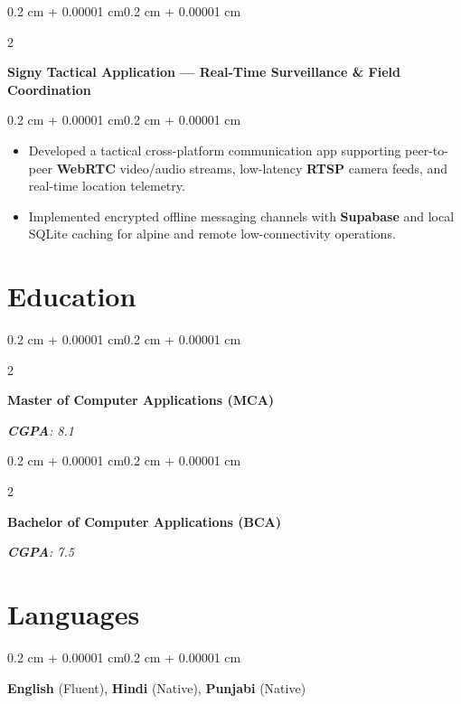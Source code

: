 \documentclass[10pt, a4paper]{article}
\newenvironment{highlights}{
    \begin{itemize}[
        topsep=0.06 cm,
        parsep=0.05 cm,
        partopsep=0pt,
        itemsep=0pt,
        leftmargin=0.4 cm + 10pt
    ]
}{
    \end{itemize}
}
\newenvironment{onecolentry}{
    \begin{adjustwidth}{0.2 cm + 0.00001 cm}{0.2 cm + 0.00001 cm}
}{
    \end{adjustwidth}
}
\newenvironment{twocolentry}[2][]{
    \onecolentry
    \def\secondColumn{#2}
    \setcolumnwidth{\fill, 4.5 cm}
    \begin{paracol}{2}
}{
    \switchcolumn \raggedleft \secondColumn
    \end{paracol}
    \endonecolentry
}
\let\hrefWithoutArrow\href
\renewcommand{\href}[2]{\hrefWithoutArrow{#1}{\ifthenelse{\equal{#2}{}}{ }{#2 }\raisebox{.15ex}{\footnotesize \faExternalLink*}}}
\begin{document}
\begin{twocolentry}{\textit{\href{https://github.com/I-am-Manu-Singh/Signy-App}{\underline{Repo}}}}
    \textbf{Signy Tactical Application — Real-Time Surveillance \& Field Coordination}
\end{twocolentry}
\vspace{0.06 cm}
\begin{onecolentry}
    \begin{highlights}
    \item Developed a tactical cross-platform communication app supporting peer-to-peer \textbf{WebRTC} video/audio streams, low-latency \textbf{RTSP} camera feeds, and real-time location telemetry.
    \item Implemented encrypted offline messaging channels with \textbf{Supabase} and local SQLite caching for alpine and remote low-connectivity operations.
    \end{highlights}
\end{onecolentry}

\section{Education}
\begin{twocolentry}{\textit{\textbf{CGPA}: 8.1}}
    \textbf{Master of Computer Applications (MCA)} 
\end{twocolentry}
\vspace{0.04 cm}
\begin{twocolentry}{\textit{\textbf{CGPA}: 7.5}}
    \textbf{Bachelor of Computer Applications (BCA)} 
\end{twocolentry}

\section{Languages}
\begin{onecolentry}
\textbf{English} (Fluent), \textbf{Hindi} (Native), \textbf{Punjabi} (Native)
\end{onecolentry}
\end{document}
